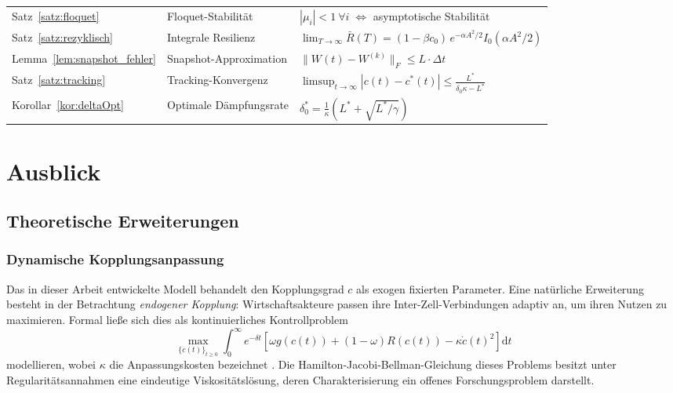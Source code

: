 \documentclass[a4paper, 12pt, twoside, openright]{report}
\theoremstyle{definition}
\theoremstyle{definition}
\begin{document}
\begin{table}[H]
\begin{tabular}{llp{7.0cm}}
Satz~\ref{satz:floquet}     & Floquet-Stabilität        & $|\mu_i|<1\ \forall i\;\Leftrightarrow$ asymptotische Stabilität \\
Satz~\ref{satz:rezyklisch}  & Integrale Resilienz       & $\lim_{T\to\infty}\bar{R}(T)=(1-\beta c_0)\,e^{-\alpha A^2/2}I_0(\alpha A^2/2)$ \\
Lemma~\ref{lem:snapshot_fehler} & Snapshot-Approximation & $\|W(t)-W^{(k)}\|_F\leq L\cdot\Delta t$ \\
Satz~\ref{satz:tracking}    & Tracking-Konvergenz       & $\limsup_{t\to\infty}|c(t)-c^*(t)|\leq\frac{L^*}{\delta_0\kappa-L^*}$ \\
Korollar~\ref{kor:deltaOpt} & Optimale Dämpfungsrate    & $\delta_0^*=\frac{1}{\kappa}(L^*+\sqrt{L^*/\gamma})$ \\
\bottomrule
\end{tabular}
\end{table}

\section{Ausblick}

\subsection{Theoretische Erweiterungen}

\subsubsection{Dynamische Kopplungsanpassung}

Das in dieser Arbeit entwickelte Modell behandelt den Kopplungsgrad $c$ als exogen fixierten
Parameter. Eine natürliche Erweiterung besteht in der Betrachtung \emph{endogener Kopplung}:
Wirtschaftsakteure passen ihre Inter-Zell-Verbindungen adaptiv an, um ihren Nutzen zu maximieren.
Formal ließe sich dies als kontinuierliches Kontrollproblem
\[
    \max_{\{c(t)\}_{t\geq 0}} \int_0^\infty e^{-\delta t}
    \left[\omega g(c(t)) + (1-\omega) R(c(t)) - \kappa \dot{c}(t)^2\right] \mathrm{d}t
\]
modellieren, wobei $\kappa$ die Anpassungskosten bezeichnet \citep{caballero2009alchemy}.
Die Hamilton-Jacobi-Bellman-Gleichung dieses Problems besitzt unter Regularitätsannahmen
eine eindeutige Viskositätslösung, deren Charakterisierung ein offenes Forschungsproblem darstellt.
\end{document}
